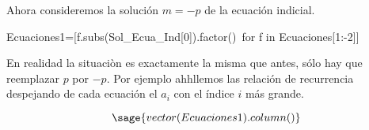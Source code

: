 \documentclass{article}
\newcounter{lem_cont}
\newcounter{ejem_cont}
\begin{document}
Ahora consideremos la solución $m=-p$ de la ecuación indicial.
\begin{sageblock}
Ecuaciones1=[f.subs(Sol_Ecua_Ind[0]).factor()\
for f in Ecuaciones[1:-2]]
\end{sageblock}

En realidad la situaciòn es exactamente la misma que antes, sólo hay que reemplazar $p$ por $-p$. Por ejemplo ahhllemos las relación de recurrencia despejando de cada ecuación el $a_i$ con el índice $i$ más grande. 
 


 \[\sage{vector(Ecuaciones1).column()}\]


\end{document}
